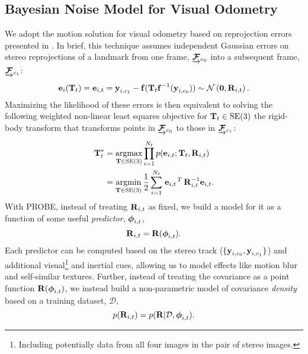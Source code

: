 \subsection{Bayesian Noise Model for Visual Odometry}
We adopt the motion solution for visual odometry based on reprojection errors presented in . In brief, this technique assumes independent Gaussian errors on stereo reprojections of a landmark from one frame, $\underrightarrow{ \boldsymbol{\mathbf{\mathcal{F}}} }_{c_0}$ into a subsequent frame, $\underrightarrow{ \boldsymbol{\mathbf{\mathcal{F}}} }_{c_1}$: 
 \begin{equation}
  \boldsymbol{\mathbf{e}}_{i}(\boldsymbol{\mathbf{T}}_t) = \boldsymbol{\mathbf{e}}_{i,t} = \boldsymbol{\mathbf{y}}_{i, c_1} - \boldsymbol{\mathbf{f}}( \boldsymbol{\mathbf{T}}_t 
    \boldsymbol{\mathbf{f}}^{-1}( \boldsymbol{\mathbf{y}}_{i, c_0} ) ) \sim 
 \mathcal{N}\left(\boldsymbol{\mathbf{0}},  \boldsymbol{\mathbf{R}}_{i,t}\right). 
\end{equation}
Maximizing the likelihood of these errors is then equivalent to solving the following weighted non-linear least squares objective for $\boldsymbol{\mathbf{T}}_t \in \mathrm{SE}(3)$ the rigid-body transform that transforms points in  $\underrightarrow{ \boldsymbol{\mathbf{\mathcal{F}}} }_{c_0}$ to those in $\underrightarrow{ \boldsymbol{\mathbf{\mathcal{F}}} }_{c_1}$:
\begin{align}
\label{eq:probe_vo_objective}
  \boldsymbol{\mathbf{T}}_t^* &=  \operatorname*{argmax}_{\boldsymbol{\mathbf{T}}\in\text{SE}(3)} \prod_{i=1}^{N_t} p(\boldsymbol{\mathbf{e}}_{i,t}; \boldsymbol{\mathbf{T}}_t,  \boldsymbol{\mathbf{R}}_{i,t}) \\
  &= \operatorname*{argmin}_{\boldsymbol{\mathbf{T}}\in\text{SE}(3)}\frac{1}{2} \sum_{i=1}^{N_t} 
  \left.{\boldsymbol{\mathbf{e}}_{i,t}}\right.^T \boldsymbol{\mathbf{R}}_{i,t}^{-1} \boldsymbol{\mathbf{e}}_{i,t}.
\end{align}
With PROBE, instead of treating $\boldsymbol{\mathbf{R}}_{i,t}$ as fixed, we build a model for it as a function of some useful \textit{predictor}, $\boldsymbol{\mathbf{\phi}}_{i,t}$, 
\begin{equation}
\boldsymbol{\mathbf{R}}_{i,t} = \boldsymbol{\mathbf{R}}(\boldsymbol{\mathbf{\phi}}_{i,t}).	
\end{equation}
Each predictor can be computed based on the stereo track ($\{\boldsymbol{\mathbf{y}}_{i, c_0}, \boldsymbol{\mathbf{y}}_{i, c_1}\}$) and additional visual\footnote{Including potentially data from all four images in the pair of stereo images.} and inertial cues, allowing us to model effects like motion blur and self-similar textures. Further, instead of treating the covariance as a point function $\boldsymbol{\mathbf{R}}(\boldsymbol{\mathbf{\phi}}_{i,t})	
$, we instead build a non-parametric model of covariance \textit{density} based on a training dataset, $\mathcal{D}$,
\begin{equation}
	p(\boldsymbol{\mathbf{R}}_{i,t}) = p(\boldsymbol{\mathbf{R}}|\mathcal{D}, \boldsymbol{\mathbf{\phi}}_{i,t}).
\end{equation}
